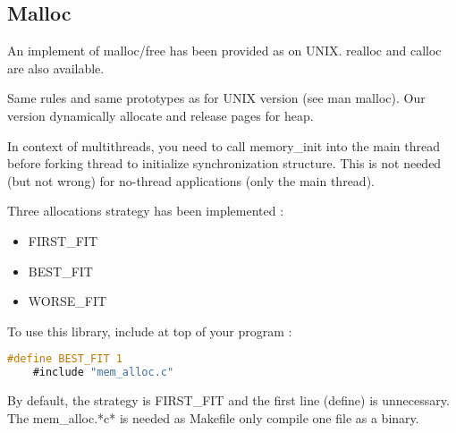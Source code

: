\subsection{Malloc}
  An implement of malloc/free has been provided as on UNIX. realloc and calloc
  are also available.

  Same rules and same prototypes as for UNIX version (see man malloc). Our
  version dynamically allocate and release pages for heap.

  In context of multithreads, you need to call memory\_init into the main thread
  before forking thread to initialize synchronization structure. This is not
  needed (but not wrong) for no-thread applications (only the main thread).

  Three allocations strategy has been implemented :
  \begin{itemize}
  \item FIRST\_FIT
  \item BEST\_FIT
  \item WORSE\_FIT
  \end{itemize}
  To use this library, include at top of your program :

  \begin{lstlisting}[language=C]
    #define BEST_FIT 1 
    #include "mem_alloc.c"
  \end{lstlisting}
  By default, the strategy is FIRST\_FIT and the first line (define) is
  unnecessary. The mem\_alloc.*c* is needed as Makefile only compile one file as
  a binary.
